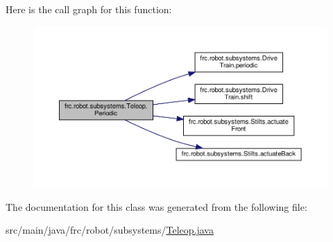 Here is the call graph for this function\+:\nopagebreak
\begin{figure}[H]
\begin{center}
\leavevmode
\includegraphics[width=350pt]{df/d7a/classfrc_1_1robot_1_1subsystems_1_1_teleop_ae90969b779b855da532e50706fa33401_cgraph}
\end{center}
\end{figure}


The documentation for this class was generated from the following file\+:\begin{DoxyCompactItemize}
\item 
src/main/java/frc/robot/subsystems/\hyperlink{_teleop_8java}{Teleop.\+java}\end{DoxyCompactItemize}
